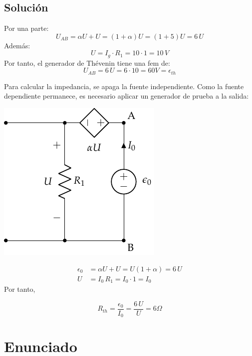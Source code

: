 \subsection*{Solución}
Por una parte:
\begin{equation*}
  U_{AB} = \alpha U + U = (1 + \alpha) U=(1+5)U=6\,U
\end{equation*}
Además:
\begin{equation*}
  U = I_g \cdot R_1=10\cdot 1 = 10\,V
\end{equation*}
Por tanto, el generador de Thévenin tiene una fem de:
\begin{equation*}
  U_{AB} = 6\, U= 6\cdot 10=60 V = \epsilon_{th}
\end{equation*}

Para calcular la impedancia, se apaga la fuente independiente. Como la
fuente dependiente permanece, es necesario aplicar un generador de
prueba a la salida:

\begin{center}
  \includegraphics{figuras/Thevenin1_fuenteprueba.pdf}
\end{center}

\begin{align*}
  \epsilon_0 &= \alpha U + U = U(1+\alpha)=6\,U\\
  U &= I_0\,R_1=I_0\cdot 1=I_0
\end{align*}
Por tanto,

\begin{equation*}
  R_{th} = \dfrac{\epsilon_0}{I_0}=\dfrac{6\,U}{U} = 6 \Omega
\end{equation*}


\section{Enunciado}

